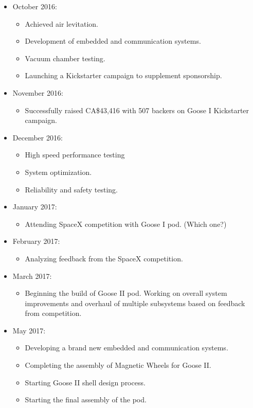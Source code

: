 \documentclass[11pt,a4paper,oldfontcommands]{memoir}
\begin{document}
\begin{itemize}
    \item October 2016:
    \begin{itemize}
        \item Achieved air levitation.
        \item Development of embedded and communication systems.
        \item Vacuum chamber testing.
        \item Launching a Kickstarter campaign to supplement sponsorship.
    \end{itemize}
    
    \item November 2016:
    \begin{itemize}
        \item Successfully raised CA\$43,416 with 507 backers on Goose I Kickstarter campaign.
    \end{itemize}
    
    \item December 2016:
    \begin{itemize}
        \item High speed performance testing
        \item System optimization.
        \item Reliability and safety testing.
    \end{itemize}
    
    \item January 2017:
    \begin{itemize}
        \item Attending SpaceX competition with Goose I pod. (Which one?)
    \end{itemize}
    
    \item February 2017:
    \begin{itemize}
        \item Analyzing feedback from the SpaceX competition.
    \end{itemize}
    
    \item March 2017:
    \begin{itemize}
        \item Beginning the build of Goose II pod. Working on overall system improvements and overhaul of multiple subsystems based on feedback from competition.
    \end{itemize}
    
    \item May 2017:
    \begin{itemize}
        \item Developing a brand new embedded and communication systems.
        \item Completing the assembly of Magnetic Wheels for Goose II.
        \item Starting Goose II shell design process.
        \item Starting the final assembly of the pod.
    \end{itemize}
    

\end{itemize}
\end{document}
